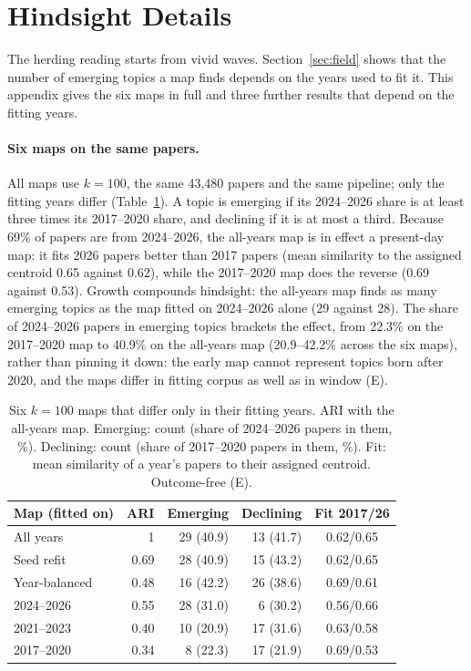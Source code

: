 \FloatBarrier
\section{Hindsight Details}\label{app:hindsight}

The herding reading starts from vivid waves. Section~\ref{sec:field} shows that the number of emerging topics a map finds depends on
the years used to fit it. This appendix gives the six maps in full and three further results that depend on the
fitting years.

\paragraph{Six maps on the same papers.} All maps use $k=100$, the same 43,480 papers and the same pipeline; only the
fitting years differ (Table~\ref{tab:app-maps}). A topic is emerging if its 2024--2026 share is at least three times
its 2017--2020 share, and declining if it is at most a third. Because 69\% of papers are from 2024--2026, the
all-years map is in effect a present-day map: it fits 2026 papers better than 2017 papers (mean similarity to the
assigned centroid 0.65 against 0.62), while the 2017--2020 map does the reverse (0.69 against 0.53). Growth compounds
hindsight: the all-years map finds as many emerging topics as the map fitted on 2024--2026 alone (29 against 28). The
share of 2024--2026 papers in emerging topics brackets the effect, from 22.3\% on the 2017--2020 map to 40.9\% on the
all-years map (20.9--42.2\% across the six maps), rather than pinning it down: the early map cannot represent topics born after 2020, and the maps differ in fitting corpus as well as in
window (E).

\begin{table}[t]
\centering\footnotesize
\setlength{\tabcolsep}{3pt}
\begin{tabular}{@{}lrrrc@{}}
\toprule
Map (fitted on) & ARI & Emerging & Declining & Fit 2017/26 \\
\midrule
All years & 1 & 29 (40.9) & 13 (41.7) & 0.62/0.65 \\
Seed refit & 0.69 & 28 (40.9) & 15 (43.2) & 0.62/0.65 \\
Year-balanced & 0.48 & 16 (42.2) & 26 (38.6) & 0.69/0.61 \\
2024--2026 & 0.55 & 28 (31.0) & 6 (30.2) & 0.56/0.66 \\
2021--2023 & 0.40 & 10 (20.9) & 17 (31.6) & 0.63/0.58 \\
2017--2020 & 0.34 & 8 (22.3) & 17 (21.9) & 0.69/0.53 \\
\bottomrule
\end{tabular}
\caption{Six $k=100$ maps that differ only in their fitting years. ARI with the all-years map. Emerging: count
(share of 2024--2026 papers in them, \%). Declining: count (share of 2017--2020 papers in them, \%). Fit: mean
similarity of a year's papers to their assigned centroid. Outcome-free (E).}
\label{tab:app-maps}
\end{table}

